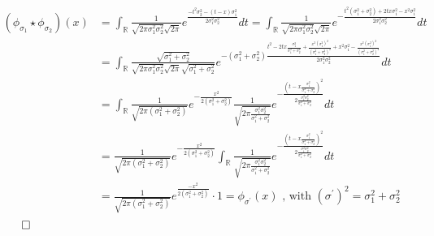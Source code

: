 \documentclass{exam}
\renewenvironment{proof}{{\noindent\itshape\ignorespaces}}{{\hfill$\qed$\\}}
\begin{document}
\begin{proof}
    \begin{equation*}
        \begin{aligned}
            (\phi_{\sigma_1}\star \phi_{\sigma_2})(x) &= \displaystyle \int_{\mathbb{R}}\displaystyle\frac{1}{\sqrt{2\pi\sigma^{2}_1\sigma^{2}_2}\sqrt{2\pi}} e^{\displaystyle\frac{-t^2\sigma^{2}_2 -(t - x)\sigma^{2}_1}{2\sigma_1^2 \sigma_2^2}} d t = \displaystyle \int_{\mathbb{R}} \displaystyle\frac{1}{\sqrt{2\pi\sigma^{2}_1\sigma^{2}_2}\sqrt{2\pi}} e^{-\displaystyle\frac{t^{2}(\sigma^{2}_1 + \sigma^{2}_2) + 2tx\sigma^{2}_1 - x^{2}\sigma^{2}_1}{2\sigma^{2}_1\sigma^{2}_2}} d t \\
            &= \displaystyle \int_{\mathbb{R}} \displaystyle\frac{\sqrt{\sigma_1^2 + \sigma^{2}_2}}{\sqrt{2\pi\sigma^{2}_1\sigma^{2}_2}\sqrt{2\pi}\sqrt{\sigma_1^2 + \sigma^{2}_2}} e^{-\displaystyle(\sigma^{2}_1 + \sigma^{2}_2)\frac{t^{2} - 2tx\frac{\sigma^{2}_1}{\sigma^{2}_1 + \sigma^{2}_2} + \frac{x^{2}(\sigma^{2}_1)^{2}}{(\sigma^{2}_1 + \sigma^{2}_2)^{2}} + x^{2}\sigma^{2}_1 - \frac{x^{2}(\sigma^{2}_1)^{2}}{(\sigma^{2}_1 + \sigma^{2}_2)^{2}} }{2\sigma^{2}_1\sigma^{2}_2}} d t \\
            &= \displaystyle \int_{\mathbb{R}} \displaystyle\frac{1}{\sqrt{2\pi(\sigma_1^2 + \sigma^{2}_2)}} e^{-\displaystyle\frac{x^{2}}{2(\sigma^{2}_1 + \sigma^{2}_2)}}\displaystyle\frac{1}{\sqrt{2\pi \frac{\sigma^{2}_1\sigma^{2}_2}{\sigma^{2}_1 + \sigma^{2}_2}}} e^{-\displaystyle\frac{(t - x\frac{\sigma^{2}_1}{\sigma^{2}_1 + \sigma^{2}_2})^{2}}{2 \frac{\sigma^{2}_1\sigma^{2}_2}{\sigma^{2}_1 + \sigma^{2}_2}}} d t \\
            &= \displaystyle\frac{1}{\sqrt{2\pi(\sigma_1^2 + \sigma^{2}_2)}} e^{-\displaystyle\frac{x^{2}}{2(\sigma^{2}_1 + \sigma^{2}_2)}} \displaystyle \int_{\mathbb{R}} \displaystyle\frac{1}{\sqrt{2\pi \frac{\sigma^{2}_1\sigma^{2}_2}{\sigma^{2}_1 + \sigma^{2}_2}}} e^{-\displaystyle\frac{(t - x\frac{\sigma^{2}_1}{\sigma^{2}_1 + \sigma^{2}_2})^{2}}{2 \frac{\sigma^{2}_1\sigma^{2}_2}{\sigma^{2}_1 + \sigma^{2}_2}}} d t \\
            &=\displaystyle \frac{1}{\sqrt{2\pi(\sigma^{2}_1 + \sigma^{2}_2)}}e^{\displaystyle\frac{-x^2}{2(\sigma_1^2 + \sigma^{2}_2)}} \cdot 1 = \phi_{\sigma^{\prime}}(x) \text{ , with } (\sigma^{\prime})^{2} = \sigma_1^2 + \sigma^{2}_2\\
        \end{aligned}
    \end{equation*}
\end{proof}
\end{document}
